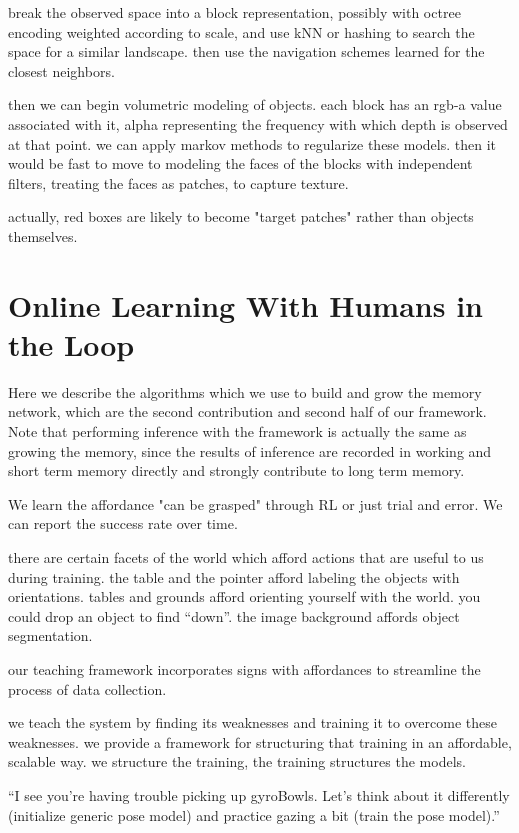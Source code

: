 \documentclass[conference]{IEEEtran}
\begin{document}
break the observed space into a block representation, possibly with octree encoding weighted 
according to scale, and use kNN or hashing to search the space for a similar landscape. then 
use the navigation schemes learned for the closest neighbors. 

then we can begin volumetric modeling of objects. each block has an rgb-a value associated 
with it, alpha representing the frequency with which depth is observed at that point.
we can apply markov methods to regularize these models. then it would be fast to move to 
modeling the faces of the blocks with independent filters, treating the faces as patches, to capture texture.

actually, red boxes are likely to become "target patches" rather than objects themselves.
    


\section{Online Learning With Humans in the Loop}
Here we describe the algorithms which we use to build and grow the memory network,
which are the second contribution and second half of our framework.
Note that performing inference with the framework is actually the same as growing the
memory, since the results of inference are recorded in working and short term memory
directly and strongly contribute to long term memory.

We learn the affordance "can be grasped" through RL or just trial and error.
We can report the success rate over time.

there are certain facets of the world which afford actions that are useful to us during 
training. the table and the pointer afford labeling the objects with orientations. 
tables and grounds afford orienting yourself with the world. you could drop an object to 
find “down”. the image background affords object segmentation.

our teaching framework incorporates signs with affordances to streamline the process 
of data collection.

we teach the system by finding its weaknesses and training it to overcome these 
weaknesses. we provide a framework for structuring that training in an affordable, 
scalable way.  we structure the training, the training structures the models.

“I see you’re having trouble picking up gyroBowls. Let’s think about it differently 
(initialize generic pose model) and practice gazing a bit (train the pose model).”
\end{document}

